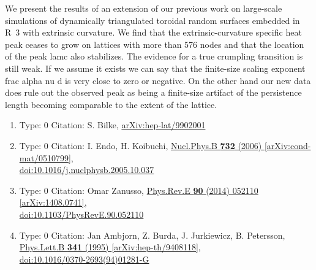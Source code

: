 \documentclass[a4paper,10pt]{article}
\begin{document}
\begin{enumerate}
We present the results of an extension of our previous work on large-scale simulations of dynamically triangulated toroidal random surfaces embedded in R~3 with extrinsic curvature. We find that the extrinsic-curvature specific heat peak ceases to grow on lattices with more than 576 nodes and that the location of the peak lamc also stabilizes. The evidence for a true crumpling transition is still weak. If we assume it exists we can say that the finite-size scaling exponent frac {alpha} {nu d} is very close to zero or negative. On the other hand our new data does rule out the observed peak as being a finite-size artifact of the persistence length becoming comparable to the extent of the lattice.
\begin{enumerate}
  \item Type: 0 Citation: S. Bilke, \href{https://arxiv.org/abs/hep-lat/9902001}{arXiv:hep-lat/9902001}
  \item Type: 0 Citation: I. Endo, H. Koibuchi, \href{https://www.doi.org/10.1016/j.nuclphysb.2005.10.037}{Nucl.Phys.B {\bf 732} (2006) }  \href{https://arxiv.org/abs/cond-mat/0510799}{[arXiv:cond-mat/0510799]},\\\href{https://www.doi.org/10.1016/j.nuclphysb.2005.10.037}{doi:10.1016/j.nuclphysb.2005.10.037}
  \item Type: 0 Citation: Omar Zanusso, \href{https://www.doi.org/10.1103/PhysRevE.90.052110}{Phys.Rev.E {\bf 90} (2014) 052110}  \href{https://arxiv.org/abs/1408.0741}{[arXiv:1408.0741]},\\\href{https://www.doi.org/10.1103/PhysRevE.90.052110}{doi:10.1103/PhysRevE.90.052110}
  \item Type: 0 Citation: Jan Ambjorn, Z. Burda, J. Jurkiewicz, B. Petersson, \href{https://www.doi.org/10.1016/0370-2693(94)01281-G}{Phys.Lett.B {\bf 341} (1995) }  \href{https://arxiv.org/abs/hep-th/9408118}{[arXiv:hep-th/9408118]},\\\href{https://www.doi.org/10.1016/0370-2693(94)01281-G}{doi:10.1016/0370-2693(94)01281-G}

\end{enumerate}
\end{enumerate}
\end{document}
